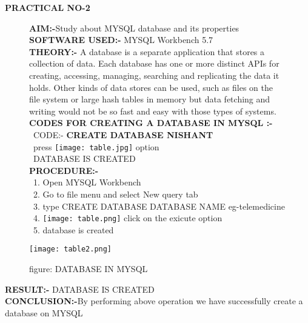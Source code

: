 \documentclass[a4paper,0pt]{article}
\begin{document}
\begin{center}
\textbf{\LARGE PRACTICAL NO-2}\\[1cm]
\end{center}
\begin{figure}[h!]
\textbf{\large AIM:-}Study about MYSQL database and its properties \\[0.75cm]
\textbf{SOFTWARE USED:-} MYSQL Workbench 5.7\\[0.75cm]
\textbf{THEORY:- }A database is a separate application that stores a collection of data. Each database has one or more distinct APIs for creating, accessing, managing, searching and replicating the data it holds.
Other kinds of data stores can be used, such as files on the file system or large hash tables in memory but data fetching and writing would not be so fast and easy with those types of systems.  \\[5mm]
\textbf{CODES FOR CREATING A DATABASE IN MYSQL :-}\\[2MM]
\ CODE:-\textbf{ CREATE DATABASE  NISHANT}\\[2mm]
\ press \texttt{[image: table.jpg]} option\\[2MM]
\ DATABASE IS CREATED \\[5MM]

\textbf{PROCEDURE:-}\\[2mm]
\ 1. Open MYSQL Workbench\\[2mm]
\ 2. Go to file menu and select New query tab\\[2mm]
\ 3. type CREATE DATABASE DATABASE NAME  eg-telemedicine\\[2mm]
\ 4. \texttt{[image: table.png]} click on the exicute option\\[2mm]
\ 5. database is created \\[2mm]
\end{figure}
\begin{figure}
\texttt{[image: table2.png]}
\caption{figure: DATABASE IN MYSQL}
\end{figure}
\newpage
\textbf{RESULT:-} DATABASE IS CREATED\\[5MM]
\textbf{CONCLUSION:-}By performing above operation we have successfully create a database on MYSQL\\[5MM]
\newpage
\end{document}
